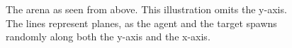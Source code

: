 \begin{figure}[H]
	\centering
	\begin{scriptsize}
		\sffamily
		
	\end{scriptsize}
	\caption[The FPS game arena]{The arena as seen from above. This illustration omits the y-axis. The lines represent planes, as the agent and the target spawns randomly along both the y-axis and the x-axis.}
	\label{fig:arena}
\end{figure}



















































